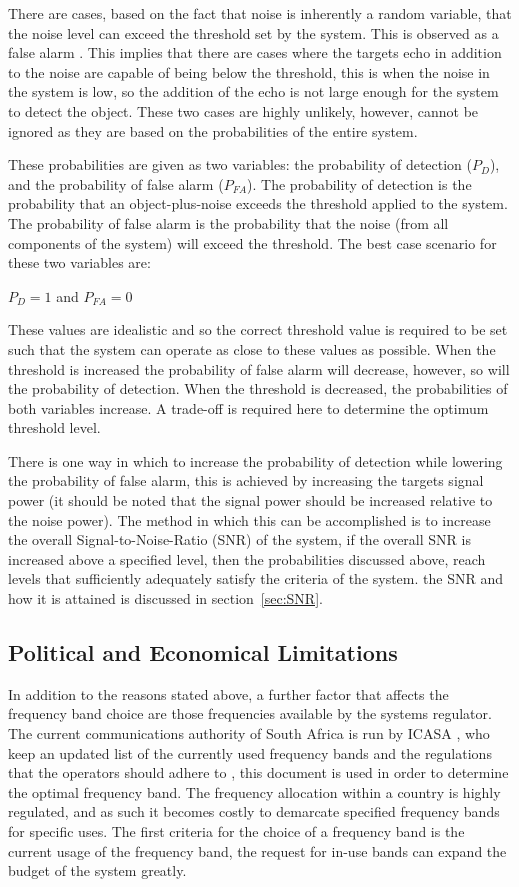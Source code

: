 \documentclass[11pt]{witseiepaper}
\begin{document}
There are cases, based on the fact that noise is inherently a random variable, that the noise level can exceed the threshold set by the system. This is observed as a false alarm \cite[Ch~.3]{radarHandbook}.
This implies that there are cases where the targets echo in addition to the noise are capable of being below the threshold, this is when the noise in the system is low, so the addition of the echo is not large enough for the system to detect the object.
These two cases are highly unlikely, however, cannot be ignored as they are based on the probabilities of the entire system.

These probabilities are given as two variables: the probability of detection ($P_{D}$), and the probability of false alarm ($P_{FA}$). The probability of detection is the probability that an object-plus-noise exceeds the threshold applied to the system. The probability of false alarm is the probability that the noise (from all components of the system) will exceed the threshold.
The best case scenario for these two variables are: 


$P_{D} = 1$ and $P_{FA} = 0$

These values are idealistic and so the correct threshold value is required to be set such that the system can operate as close to these values as possible.
When the threshold is increased the probability of false alarm will decrease, however, so will the probability of detection. When the threshold is decreased, the probabilities of both variables increase. A trade-off is required here to determine the optimum threshold level.

There is one way in which to increase the probability of detection while lowering the probability of false alarm, this is achieved by increasing the targets signal power (it should be noted that the signal power should be increased relative to the noise power). The method in which this can be accomplished is to increase the overall Signal-to-Noise-Ratio (SNR) of the system, if the overall SNR is increased above a specified level, then the probabilities discussed above, reach levels that sufficiently adequately satisfy the criteria of the system. the SNR and how it is attained is discussed in section~\ref{sec:SNR}. 

\subsection{Political and Economical Limitations} \label{sec:PoliticalandEconomicalLimitations}
In addition to the reasons stated above, a further factor that affects the frequency band choice are those frequencies available by the systems regulator. The current communications authority of South Africa is run by ICASA \cite{ICASA}, who keep an updated list of the currently used frequency bands and the regulations that the operators should adhere to \cite{frequencyAllocation}, this document is used in order to determine the optimal frequency band.
The frequency allocation within a country is highly regulated, and as such it becomes costly to demarcate specified frequency bands for specific uses.
The first criteria for the choice of a frequency band is the current usage of the frequency band, the request for in-use bands can expand the budget of the system greatly.
\end{document}
